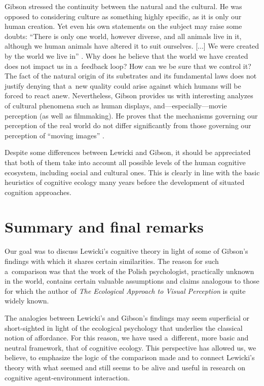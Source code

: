 \documentclass[%
manuscript=article,
year=2024,
volume=77,
doi=00000.000,
]{zfn}
\begin{document}
Gibson stressed the continuity between the natural and the cultural. He was opposed to considering culture as something highly specific, as it is only our human creation. Yet even his own statements on the subject may raise some doubts: ``There is only one world, however diverse, and all animals live in it, although we human animals have altered it to suit ourselves. [...] We were created by the world we live in'' 
\parencite[][p.130]{gibson_ecological_1979}. %
 Why does he believe that the world we have created does not impact us in a~feedback loop? How can we be sure that we control it? The fact of the natural origin of its substrates and its fundamental laws does not justify denying that a~new quality could arise against which humans will be forced to react anew. Nevertheless, Gibson provides us with interesting analyzes of cultural phenomena such as human displays, and---especially---movie perception (as well as filmmaking). He proves that the mechanisms governing our perception of the real world do not differ significantly from those governing our perception of ``moving images'' 
\parencites[][]{gibson_senses_1966}[][]{gibson_ecological_1979}.%




Despite some differences between Lewicki and Gibson, it should be appreciated that both of them take into account all possible levels of the human cognitive ecosystem, including social and cultural ones. This is clearly in line with the basic heuristics of cognitive ecology many years before the development of situated cognition approaches.



\section{Summary and final remarks}

Our goal was to discuss Lewicki's cognitive theory in light of some of Gibson's findings with which it shares certain similarities. The reason for such a~comparison was that the work of the Polish psychologist, practically unknown in the world, contains certain valuable assumptions and claims analogous to those for which the author of \textit{The Ecological Approach to Visual Perception} is quite widely known.



The analogies between Lewicki's and Gibson's findings may seem superficial or short-sighted in light of the ecological psychology that underlies the classical notion of affordance. For this reason, we have used a~different, more basic and neutral framework, that of cognitive ecology. This perspective has allowed us, we believe, to emphasize the logic of the comparison made and to connect Lewicki's theory with what seemed and still seems to be alive and useful in research on cognitive agent-environment interaction.
\end{document}
